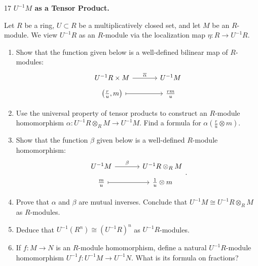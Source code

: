 \documentclass[Notebook.tex]{subfiles}
\begin{document}
\newpage 

\begin{problem}{17}
	\textbf{$U^{-1}M$ as a Tensor Product.} 
	
	Let $R$ be a ring, $U\subset R$ be a multiplicatively closed set, and let $M$ be an $R$-module. We view $U^{-1}R$ as an $R$-module via the localization map $\eta:R\to U^{-1}R$.
	\begin{enumerate}
		\item Show that the function given below is a well-defined bilinear map of $R$-modules:
		\[
		\begin{tikzcd}[row sep = .5em, column sep = 3.5em]
		U^{-1}R\times M\arrow[r, "\overline{\alpha}"] & U^{-1}M\\
		 \left(\frac{r}{u},m\right)\arrow[r, mapsto] & \frac{rm}{u}
		 \end{tikzcd}
		\]
		\item Use the universal property of tensor products to construct an $R$-module homomorphism $\alpha:U^{-1}R\otimes_R M\to U^{-1}M$. Find a formula for $\alpha\left(\frac{r}{u}\otimes m\right)$.
		\item Show that the function $\beta$ given below is a well-defined $R$-module homomorphism:
		\[
		\begin{tikzcd}[row sep = .5em, column sep = 3.5em]
		U^{-1}M\arrow[r, "\beta"] & U^{-1}R\otimes_R M \\
		 \frac{m}{u}\arrow[r, mapsto] & \frac{1}{u}\otimes m
		 \end{tikzcd}.
		\]
		\item Prove that $\alpha$ and $\beta$ are mutual inverses. Conclude that $U^{-1}M\cong U^{-1}R\otimes_R M$ as $R$-modules. 
		\item Deduce that $U^{-1}(R^n)\cong (U^{-1}R)^n$ as $U^{-1}R$-modules.
		\item If $f:M\to N$ is an $R$-module homomorphism, define a natural $U^{-1}R$-module homomorphism $U^{-1}f:U^{-1}M\to U^{-1}N$. What is its formula on fractions?
	\end{enumerate}
\end{problem}
\end{document}

